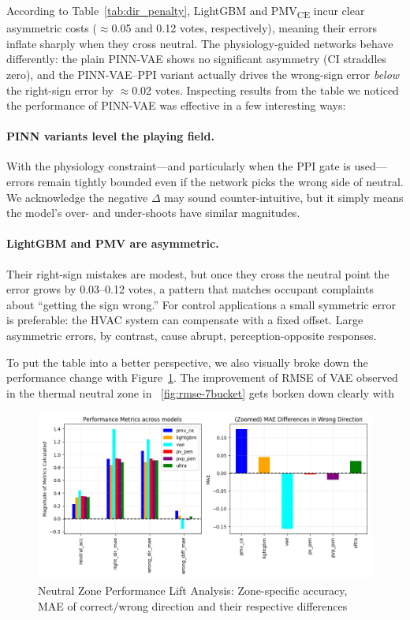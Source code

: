 According to Table~\ref{tab:dir_penalty}, LightGBM and PMV\textsubscript{CE} incur clear asymmetric costs ($\approx$0.05 and 0.12 votes, respectively), meaning their errors inflate sharply when they cross neutral.
The physiology-guided networks behave differently: the plain PINN-VAE shows no significant asymmetry (CI straddles zero), and the PINN-VAE–PPI variant actually drives the wrong-sign error \emph{below} the right-sign error by $\approx$0.02 votes. Inspecting results from the table we noticed the performance of PINN-VAE was effective in a few interesting ways:

\paragraph{PINN variants level the playing field.}  
  With the physiology constraint—and particularly when the PPI gate is used—errors remain tightly bounded even if the network picks the wrong side of neutral.  We acknowledge the negative $\Delta$ may sound counter-intuitive, but it simply means the model’s over- and under-shoots have similar magnitudes.

\paragraph{LightGBM and PMV are asymmetric.}  
  Their right-sign mistakes are modest, but once they cross the neutral point the error grows by 0.03–0.12 votes, a pattern that matches occupant complaints about “getting the sign wrong.”  For control applications a small symmetric error is preferable: the HVAC system can compensate with a fixed offset.  Large asymmetric errors, by contrast, cause abrupt, perception-opposite responses.

To put the table into a better perspective, we also visually broke down the performance change with Figure~\ref{fig:neu_zone}. The improvement of RMSE of VAE observed in the thermal neutral zone in ~\ref{fig:rmse-7bucket} gets borken down clearly with 

\begin{figure}[h!]
    \centering
    \includegraphics[width=0.95\linewidth]{fig/w5_dir.png}
    \caption{Neutral Zone Performance Lift Analysis: Zone-specific accuracy, MAE of correct/wrong direction and their respective differences}
    \label{fig:neu_zone}
\end{figure}

